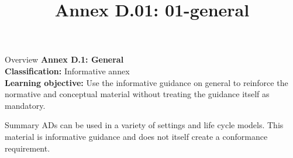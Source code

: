 \documentclass[10pt,letterpaper]{article}
\title{Annex D.01: 01-general}
\author{}
\date{}
\begin{document}
\maketitle
\begin{CornellOverviewBox}{Overview}
{\Large\bfseries\textcolor{CNavy}{Annex D.1: General}}\\[3pt]
{\small\textbf{Classification:} Informative annex}\\
{\small\textbf{Learning objective:} Use the informative guidance on general to reinforce the normative and conceptual material without treating the guidance itself as mandatory.}
\end{CornellOverviewBox}
\vspace{3pt}

\begin{CornellNotesTable}
\end{CornellNotesTable}


\begin{CornellSummaryBox}{Summary}
ADs can be used in a variety of settings and life cycle models. This material is informative guidance and does not itself create a conformance requirement.
\end{CornellSummaryBox}
\end{document}
